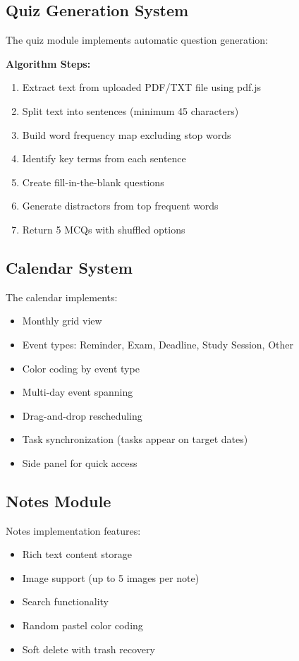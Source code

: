 \subsection{Quiz Generation System}
The quiz module implements automatic question generation:

\textbf{Algorithm Steps:}
\begin{enumerate}
    \item Extract text from uploaded PDF/TXT file using pdf.js
    \item Split text into sentences (minimum 45 characters)
    \item Build word frequency map excluding stop words
    \item Identify key terms from each sentence
    \item Create fill-in-the-blank questions
    \item Generate distractors from top frequent words
    \item Return 5 MCQs with shuffled options
\end{enumerate}

\subsection{Calendar System}
The calendar implements:
\begin{itemize}
    \item Monthly grid view
    \item Event types: Reminder, Exam, Deadline, Study Session, Other
    \item Color coding by event type
    \item Multi-day event spanning
    \item Drag-and-drop rescheduling
    \item Task synchronization (tasks appear on target dates)
    \item Side panel for quick access
\end{itemize}

\subsection{Notes Module}
Notes implementation features:
\begin{itemize}
    \item Rich text content storage
    \item Image support (up to 5 images per note)
    \item Search functionality
    \item Random pastel color coding
    \item Soft delete with trash recovery
\end{itemize}

